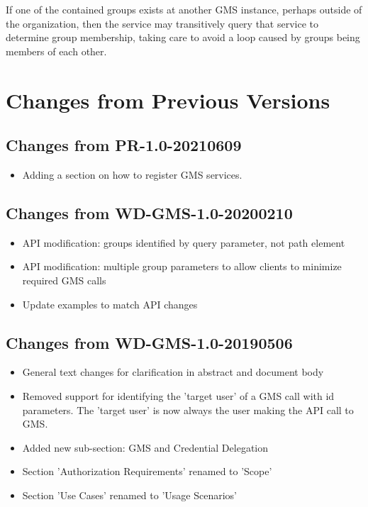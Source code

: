 \documentclass[11pt,a4paper]{ivoa}
\begin{document}
If one of the contained groups exists at another GMS instance, perhaps outside of the organization, then the service may transitively query that service to determine group membership, taking care to avoid a loop caused by groups being members of each other.


\appendix

\section{Changes from Previous Versions}
\label{sec:changehistory}

\subsection{Changes from PR-1.0-20210609}

\begin{itemize}
\item Adding a section on how to register GMS services.
\end{itemize}

\subsection{Changes from WD-GMS-1.0-20200210}
\begin{itemize}
\item{API modification: groups identified by query parameter, not path element}
\item{API modification: multiple group parameters to allow clients to minimize required GMS calls}
\item{Update examples to match API changes}
\end{itemize}

\subsection{Changes from WD-GMS-1.0-20190506}
\begin{itemize}
\item{General text changes for clarification in abstract and document body}
\item{Removed support for identifying the 'target user' of a GMS call with id parameters.  The 'target user' is now always the user making the API call to GMS.}
\item{Added new sub-section: GMS and Credential Delegation}
\item{Section 'Authorization Requirements' renamed to 'Scope'}
\item{Section 'Use Cases' renamed to 'Usage Scenarios'}
\end{itemize}
\end{document}
